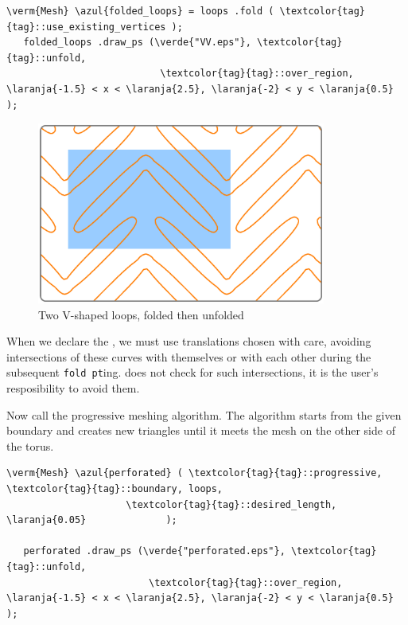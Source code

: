 \begin{Verbatim}[commandchars=\\\{\},formatcom=\small\tt,frame=single,
   rulecolor=\color{moldura},baselinestretch=0.94,framesep=2mm         ]
   \verm{Mesh} \azul{folded_loops} = loops .fold ( \textcolor{tag}{tag}::use_existing_vertices );
   folded_loops .draw_ps (\verde{"VV.eps"}, \textcolor{tag}{tag}::unfold,
                           \textcolor{tag}{tag}::over_region, \laranja{-1.5} < x < \laranja{2.5}, \laranja{-2} < y < \laranja{0.5} );
\end{Verbatim}

\begin{figure}[ht] \centering
  \includegraphics[width=95mm]{boomerang-2.eps}
  \caption{Two V-shaped loops, folded then unfolded}
  \label{\numb section 7.\numb fig 20}
\end{figure}

When we declare the {\small\tt{}}, we must use translations chosen with care,
avoiding intersections of these curves with themselves or with each other during the subsequent
\mbox{{\small\tt fold pt}ing}.
\ManiFEM{} does not check for such intersections, it is the user's resposibility to avoid them.

Now call the progressive meshing algorithm.
The algorithm starts from the given boundary and creates new triangles until
it meets the mesh on the other side of the torus.

\begin{Verbatim}[commandchars=\\\{\},formatcom=\small\tt,frame=single,
   label=code not working,rulecolor=\color{moldura},
   baselinestretch=0.94,framesep=2mm                                   ]
   \verm{Mesh} \azul{perforated} ( \textcolor{tag}{tag}::progressive, \textcolor{tag}{tag}::boundary, loops,
                     \textcolor{tag}{tag}::desired_length, \laranja{0.05}              );

   perforated .draw_ps (\verde{"perforated.eps"}, \textcolor{tag}{tag}::unfold,
                         \textcolor{tag}{tag}::over_region, \laranja{-1.5} < x < \laranja{2.5}, \laranja{-2} < y < \laranja{0.5} );
\end{Verbatim}

